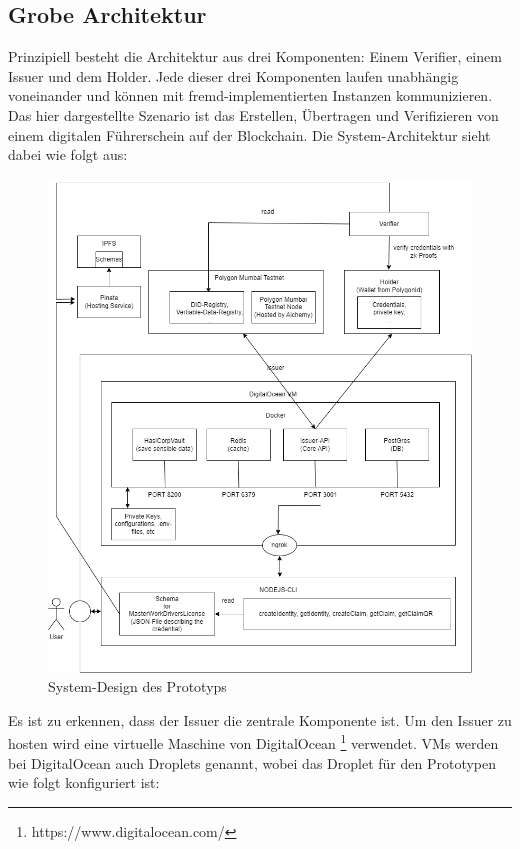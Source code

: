 \subsection{Grobe Architektur}
Prinzipiell besteht die Architektur aus drei Komponenten: Einem Verifier, einem Issuer und dem Holder. Jede dieser drei Komponenten laufen unabhängig voneinander und können mit fremd-implementierten Instanzen kommunizieren. Das hier dargestellte Szenario ist das Erstellen, Übertragen und Verifizieren von einem digitalen Führerschein auf der Blockchain. Die System-Architektur sieht dabei wie folgt aus:
\begin{figure}[h]
	\centering
	\includegraphics[scale=0.4]{media/system-design}
	\caption{System-Design des Prototyps}
	\label{fig:meine-grafik}
\end{figure}
Es ist zu erkennen, dass der Issuer die zentrale Komponente ist. Um den Issuer zu hosten wird eine virtuelle Maschine von DigitalOcean \footnote{https://www.digitalocean.com/} verwendet. VMs werden bei DigitalOcean auch Droplets genannt, wobei das Droplet für den Prototypen wie folgt konfiguriert ist:
